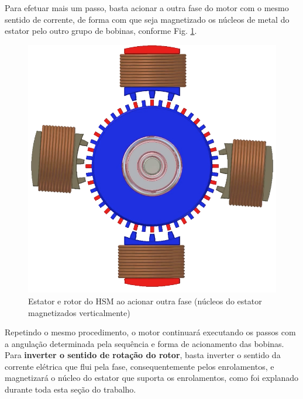 	Para efetuar mais um passo, basta acionar a outra fase do motor com o mesmo sentido de corrente, de forma com que seja magnetizado os núcleos de metal do estator pelo outro grupo de bobinas, conforme Fig. \ref{acionamento2}.
	
	\begin{figure}[H]
		\centering 
		\includegraphics[scale=0.3]{images/hsm_operation/etapa2}
		\caption{Estator e rotor do HSM ao acionar outra fase (núcleos do estator magnetizados verticalmente)}
		\label{acionamento2}
	\end{figure}
	
	Repetindo o mesmo procedimento, o motor continuará executando os passos com a angulação determinada pela sequência e forma de acionamento das bobinas. Para \textbf{inverter o sentido de rotação do rotor}, basta inverter o sentido da corrente elétrica que flui pela fase, consequentemente pelos enrolamentos, e magnetizará o núcleo do estator que suporta os enrolamentos, como foi explanado durante toda esta seção do trabalho. 
	